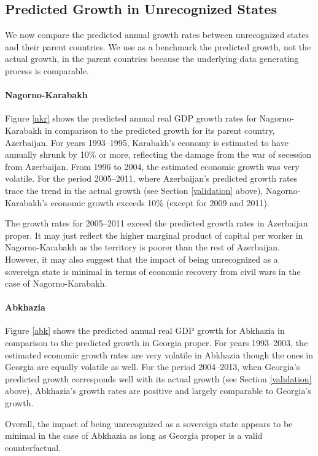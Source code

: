 \documentclass[12pt,a4paper]{article}%
\begin{document}
\subsection{Predicted Growth in Unrecognized States}
We now compare the predicted annual growth rates between unrecognized states and their parent countries. 
We use as a benchmark the predicted growth, not the actual growth, in the parent countries because the underlying data generating process is comparable.

\paragraph{Nagorno-Karabakh}
Figure \ref{nkr} shows the predicted annual real GDP growth rates for Nagorno-Karabakh in comparison to the predicted growth for its parent country, Azerbaijan. 
For years 1993--1995, Karabakh's economy is estimated to have annually shrunk by 10\% or more, reflecting the damage from the war of secession from Azerbaijan. 
From 1996 to 2004, the estimated economic growth was very volatile.
For the period 2005--2011, where Azerbaijan's predicted growth rates trace the trend in the actual growth (see Section \ref{validation} above), Nagorno-Karabakh's economic growth exceeds 10\% (except for 2009 and 2011). 

The growth rates for 2005--2011 exceed the predicted growth rates in Azerbaijan proper.
It may just reflect the higher marginal product of capital per worker in Nagorno-Karabakh as the territory is poorer than the rest of Azerbaijan. 
However, it may also suggest that the impact of being unrecognized as a sovereign state is minimal in terms of economic recovery from civil wars in the case of Nagorno-Karabakh.

\paragraph{Abkhazia}
Figure \ref{abk} shows the predicted annual real GDP growth for Abkhazia in comparison to the predicted growth in Georgia proper. 
For years 1993--2003, the estimated economic growth rates are very volatile in Abkhazia though the ones in Georgia are equally volatile as well.
For the period 2004--2013, when Georgia's predicted growth corresponds well with its actual growth (see Section \ref{validation} above), Abkhazia's growth rates are positive and largely comparable to Georgia's growth.   

Overall, the impact of being unrecognized as a sovereign state appears to be minimal in the case of Abkhazia as long as Georgia proper is a valid counterfactual.
\end{document}
